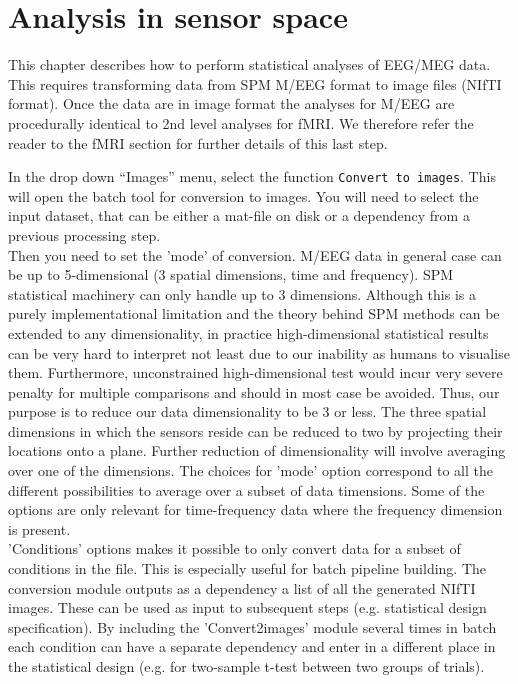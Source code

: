 \chapter{Analysis in sensor space \label{Chap:eeg:sensoranalysis}}

This chapter describes how to perform statistical analyses of EEG/MEG data. This requires transforming data from SPM M/EEG format to image files (NIfTI format). Once the data are in image format the analyses for M/EEG are procedurally identical to 2nd level analyses for fMRI.  We therefore refer the reader to the fMRI section for further details of this last step. 

In the drop down ``Images'' menu, select the function \texttt{Convert to images}. This will open the batch tool for conversion to images. You will need to select the input dataset, that can be either a mat-file on disk or a dependency from a previous processing step.
\\
Then you need to set the 'mode' of conversion. M/EEG data in general case can be up to 5-dimensional (3 spatial dimensions, time and frequency). SPM statistical machinery can only handle up to 3 dimensions. Although this is a purely implementational limitation and the theory behind SPM methods can be extended to any dimensionality, in practice high-dimensional statistical results can be very hard to interpret not least due to our inability as humans to visualise them. Furthermore, unconstrained high-dimensional test would incur very severe penalty for multiple comparisons and should in most case be avoided. Thus, our purpose is to reduce our data dimensionality to be 3 or less. The three spatial dimensions in which the sensors reside can be reduced to two by projecting their locations onto a plane. Further reduction of dimensionality will involve averaging over one of the dimensions. The choices for 'mode' option correspond to all the different possibilities to average over a subset of data timensions. Some of the options are only relevant for time-frequency data where the frequency dimension is present.
\\
'Conditions' options makes it possible to only convert data for a subset of conditions in the file. This is especially useful for batch pipeline building. The conversion module outputs as a dependency a list of all the generated NIfTI images. These can be used as input to subsequent steps (e.g. statistical design specification). By including the 'Convert2images' module several times in batch each condition can have a separate dependency and enter in a different place in the statistical design (e.g. for two-sample t-test between two groups of trials). 
